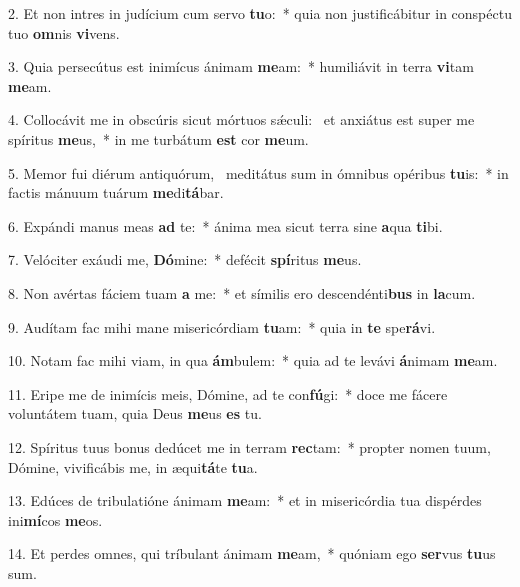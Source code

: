 2. Et non intres in judícium cum servo \textbf{tu}o:~*  quia non justificábitur in conspéctu tuo \textbf{om}nis \textbf{vi}vens.\

3. Quia persecútus est inimícus ánimam \textbf{me}am:~*  humiliávit in terra \textbf{vi}tam \textbf{me}am.\

4. Collocávit me in obscúris sicut mórtuos sǽculi: \dag\  et anxiátus est super me spíritus \textbf{me}us,~*  in me turbátum \textbf{est} cor \textbf{me}um.\

5. Memor fui diérum antiquórum, \dag\  meditátus sum in ómnibus opéribus \textbf{tu}is:~*  in factis mánuum tuárum \textbf{me}di\textbf{tá}bar.\

6. Expándi manus meas \textbf{ad} te:~*  ánima mea sicut terra sine \textbf{a}qua \textbf{ti}bi.\

7. Velóciter exáudi me, \textbf{Dó}mine:~*  defécit \textbf{spí}ritus \textbf{me}us.\

8. Non avértas fáciem tuam \textbf{a} me:~*  et símilis ero descendénti\textbf{bus} in \textbf{la}cum.\

9. Audítam fac mihi mane misericórdiam \textbf{tu}am:~*  quia in \textbf{te} spe\textbf{rá}vi.\

10. Notam fac mihi viam, in qua \textbf{ám}bulem:~*  quia ad te levávi \textbf{á}nimam \textbf{me}am.\

11. Eripe me de inimícis meis, Dómine, ad te con\textbf{fú}gi:~*  doce me fácere voluntátem tuam, quia Deus \textbf{me}us \textbf{es} tu.\

12. Spíritus tuus bonus dedúcet me in terram \textbf{rec}tam:~*  propter nomen tuum, Dómine, vivificábis me, in æqui\textbf{tá}te \textbf{tu}a.\

13. Edúces de tribulatióne ánimam \textbf{me}am:~*  et in misericórdia tua dispérdes ini\textbf{mí}cos \textbf{me}os.\

14. Et perdes omnes, qui tríbulant ánimam \textbf{me}am,~*  quóniam ego \textbf{ser}vus \textbf{tu}us sum.\

